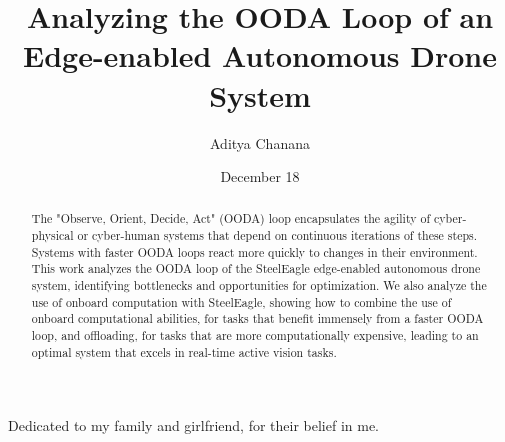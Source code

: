 \documentclass[12pt]{cmuthesis}
\begin{document}
\frontmatter

\pagestyle{empty}

\title{ %
{\bf Analyzing the OODA Loop of an Edge-enabled Autonomous Drone System}}
\author{Aditya Chanana}
\date{December 18}
\trnumber{}


\support{}
\disclaimer{}



\maketitle

\begin{dedication}
    Dedicated to my family and girlfriend, for their belief in me.
\end{dedication}

\pagestyle{plain} %


\begin{abstract}

    The "Observe, Orient, Decide, Act" (OODA) loop encapsulates the agility of
    cyber-physical or cyber-human systems that depend on continuous iterations
    of these steps. Systems with faster OODA loops react more quickly to
    changes in their environment. This work analyzes the OODA loop of the
    SteelEagle edge-enabled autonomous drone system, identifying bottlenecks
    and opportunities for optimization.
    We also analyze the use of onboard computation with SteelEagle, showing how
    to combine the use of onboard computational abilities, for tasks that
    benefit immensely from a faster OODA loop, and offloading, for tasks that
    are more computationally expensive, leading to an optimal system that
    excels in real-time active vision tasks.

\end{abstract}
\end{document}
